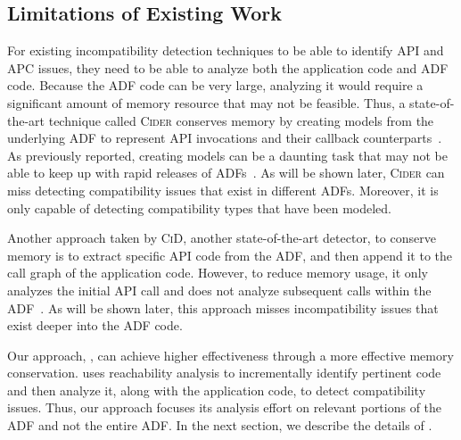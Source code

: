 \subsection{Limitations of Existing Work}


For existing incompatibility detection techniques to be able
to identify API and APC issues, they need to be able to
analyze both the application code and ADF code. Because the
ADF code can be very large, analyzing it would require a
significant amount of memory resource that may not be
feasible. Thus, a state-of-the-art technique called
\textsc{Cider} conserves memory by creating models from the
underlying ADF to represent API invocations and their
callback counterparts~\cite{huang2018understanding}.  As
previously reported, creating models can be a daunting task
that may not be able to keep up with rapid releases of
ADFs~\cite{vanderMerwe2012}.  As will be shown later,
\textsc{Cider} can miss detecting compatibility issues that
exist in different ADFs.  Moreover, it is only capable of
detecting compatibility types that have been modeled.

Another approach taken by \textsc{CiD}, another
state-of-the-art detector, to conserve memory is to extract
specific API code from the ADF, and then append it to the
call graph of the application code. However, to reduce
memory usage, it only analyzes the initial API call and does
not analyze subsequent calls within the
ADF~\cite{lili2018cid}. As will be
shown later, this approach misses incompatibility issues
that exist deeper into the ADF code.  

Our approach, \@approach,  can achieve higher
effectiveness through a more effective memory conservation.
\@approach uses reachability analysis to
incrementally identify pertinent code and then analyze it,
along with the application code, to detect compatibility
issues. Thus, our approach focuses its analysis effort on
relevant portions of the ADF and not the entire ADF.  
In the next section, we describe the details of
\@approach.

